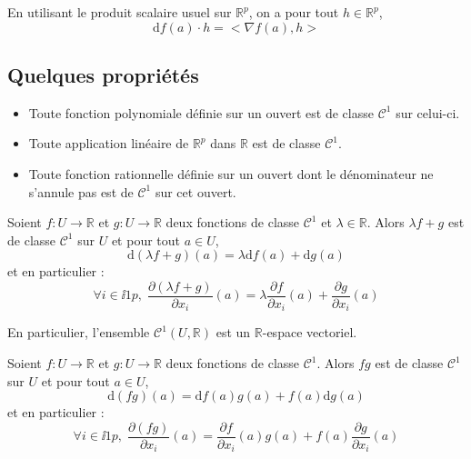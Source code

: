\documentclass[french,11pt,twoside]{VcCours}
\begin{document}
\begin{Remarque}{} En utilisant le produit scalaire usuel sur $\mathbb{R}^p$, on a pour tout $h \in \mathbb{R}^p$,
$$ \textrm{d}f(a) \cdot h = < \nabla f(a),h>$$
\end{Remarque}
\subsection{Quelques propriétés}

\begin{Proposition}{} 
\begin{itemize}
\item Toute fonction polynomiale définie sur un ouvert est de classe $\mathcal{C}^1$ sur celui-ci.
\item Toute application linéaire de $\mathbb{R}^p$ dans $\mathbb{R}$ est de classe $\mathcal{C}^1$.
\item Toute fonction rationnelle définie sur un ouvert dont le dénominateur ne s'annule pas est de $\mathcal{C}^1$ sur cet ouvert.
\end{itemize}
\end{Proposition}

\begin{Proposition}{} Soient $f : U \rightarrow \mathbb{R}$ et $g :  U \rightarrow \mathbb{R}$ deux fonctions de classe $\mathcal{C}^1$ et $\lambda \in \mathbb{R}$. Alors $\lambda f+g$ est de classe $\mathcal{C}^1$ sur $U$ et pour tout $a \in U$,
$$ \textrm{d}(\lambda f + g)(a) = \lambda \textrm{d}f(a)+\textrm{d}g(a)$$
et en particulier :
$$ \forall i \in \ii{1}{p}, \; \dfrac{\partial (\lambda f +g)}{\partial x_i}(a) = \lambda \dfrac{\partial f}{\partial x_i}(a) +  \dfrac{\partial g}{\partial x_i}(a)$$
\end{Proposition}

\begin{Remarque}{} En particulier, l'ensemble $\mathcal{C}^1(U, \mathbb{R})$ est un $\mathbb{R}$-espace vectoriel.
\end{Remarque}

\begin{Proposition}{} Soient $f : U \rightarrow \mathbb{R}$ et $g :  U \rightarrow \mathbb{R}$ deux fonctions de classe $\mathcal{C}^1$. Alors $fg$ est de classe $\mathcal{C}^1$ sur $U$ et pour tout $a \in U$,
$$ \textrm{d}(fg)(a) =\textrm{d}f(a)g(a) + f(a) \textrm{d}g(a)$$
et en particulier :
$$ \forall i \in \ii{1}{p}, \; \dfrac{\partial (fg)}{\partial x_i}(a) = \dfrac{\partial f}{\partial x_i}(a) g(a) +f(a)  \dfrac{\partial g}{\partial x_i}(a)$$
\end{Proposition}
\end{document}
